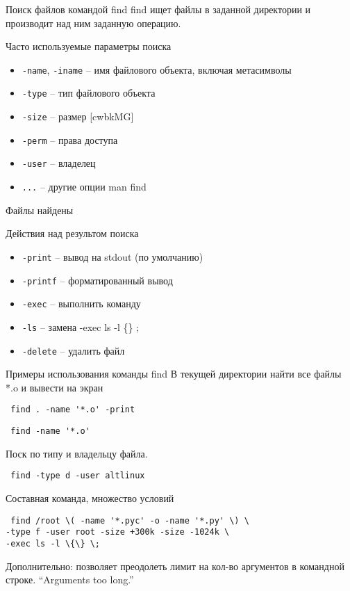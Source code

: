 \begin{frame}[fragile]{Поиск файлов командой find}
    \alert{find} ищет файлы в заданной директории и производит над ним заданную операцию.
	\begin{block}{Часто используемые параметры поиска}
		\begin{itemize}
			\item {\tt -name}, {\tt -iname} -- имя файлового объекта, включая метасимволы 
			\item {\tt -type} -- тип файлового объекта
			\item {\tt -size} -- размер [cwbkMG]
			\item {\tt -perm} -- права доступа
			\item {\tt -user} -- владелец
			\item {\tt ...} -- другие опции man find 
		\end{itemize}
	\end{block}
\end{frame}

\begin{frame}[fragile]{Файлы найдены}
	\begin{block}{Действия над результом поиска}
		\begin{itemize}
			\item {\tt -print} -- вывод на stdout (по умолчанию)
			\item {\tt -printf} -- форматированный вывод
			\item {\tt -exec} -- выполнить команду
			\item {\tt -ls} -- замена -exec ls -l \{\} ;
			\item {\tt -delete} -- удалить файл
		\end{itemize}
	\end{block}
\end{frame}

\begin{frame}[fragile]{Примеры использования команды find}
            В текущей директории найти все файлы *.o и вывести на экран 
            \begin{verbatim} find . -name '*.o' -print \end{verbatim}
            \begin{verbatim} find -name '*.o' \end{verbatim}
            Поск по типу и владельцу файла.
            \begin{verbatim} find -type d -user altlinux \end{verbatim}
            Составная команда, множество условий
            \begin{verbatim} find /root \( -name '*.pyc' -o -name '*.py' \) \
-type f -user root -size +300k -size -1024k \
-exec ls -l \{\} \; \end{verbatim}
 Дополнительно: позволяет преодолеть лимит на кол-во аргументов в командной строке. 
 \textquotedblleft Arguments too long.\textquotedblright 
\end{frame}

